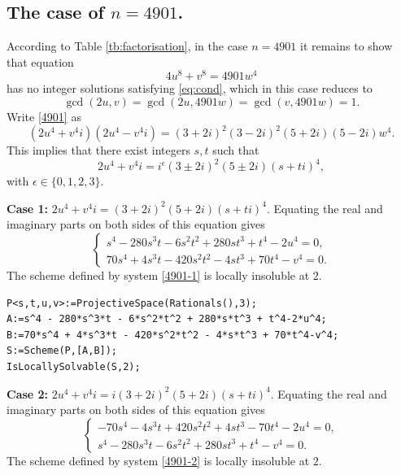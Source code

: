 \documentclass[a4paper,12pt,english,reqno]{amsart}
\begin{document}
\subsection{The case of $n=4901$.} %
According to Table \ref{tb:factorisation}, in the case $n=4901$ it remains to
show that equation 
\begin{equation}\label{4901}
4u^8+v^8=4901w^4
\end{equation}
has no integer solutions satisfying \eqref{eq:cond}, which in this case reduces to \[\gcd(2u,v)=\gcd(2u,4901w)=\gcd(v,4901w)=1.\]
Write \eqref{4901} as
\begin{equation} (2u^4+v^4i)(2u^4-v^4i)=(3+2i)^2(3-2i)^2(5+2i)(5-2i)w^4.
\end{equation}
This implies that there exist integers $s,t$ such that 
\[2u^4+v^4i=i^{\epsilon}(3\pm 2i)^2(5\pm 2i)(s+ti)^4,\]
with $\epsilon \in \{0,1,2,3\}$.



{\bf Case 1:} $2u^4+v^4i=(3+ 2i)^2(5+ 2i)(s+ti)^4$. Equating the real and imaginary parts on both sides of this equation gives
\begin{equation}\label{4901-1}
\begin{cases}
s^4 - 280s^3t - 6s^2t^2 + 280st^3 + t^4 - 2u^4=0,\\
70s^4 + 4s^3t - 420s^2t^2 - 4st^3 + 70t^4 - v^4=0.
\end{cases}
\end{equation}
The scheme defined by system \eqref{4901-1} is locally insoluble at $2$.



\begin{lstlisting}
P<s,t,u,v>:=ProjectiveSpace(Rationals(),3);
A:=s^4 - 280*s^3*t - 6*s^2*t^2 + 280*s*t^3 + t^4-2*u^4;
B:=70*s^4 + 4*s^3*t - 420*s^2*t^2 - 4*s*t^3 + 70*t^4-v^4;
S:=Scheme(P,[A,B]);
IsLocallySolvable(S,2);
\end{lstlisting}


{\bf Case 2:} $2u^4+v^4i=i(3+ 2i)^2(5+ 2i)(s+ti)^4$. Equating the real and imaginary parts on both sides of this equation gives
\begin{equation}\label{4901-2}
\begin{cases}
-70s^4 - 4s^3t + 420s^2t^2 + 4st^3 - 70t^4 - 2u^4=0,\\
s^4 - 280s^3t - 6s^2t^2 + 280st^3 + t^4 - v^4=0.
\end{cases}
\end{equation}
The scheme defined by system \eqref{4901-2} is locally insoluble at $2$.
\end{document}
